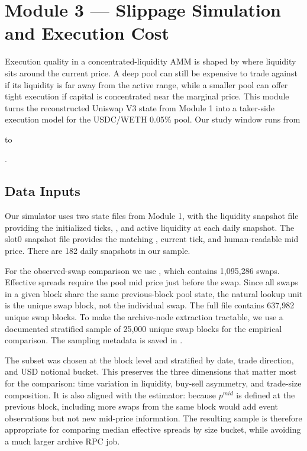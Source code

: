\section{Module 3 --- Slippage Simulation and Execution Cost}
\label{sec:module3}

Execution quality in a concentrated-liquidity AMM is shaped by where liquidity
sits around the current price.  A deep pool can still be expensive to trade
against if its liquidity is far away from the active range, while a smaller pool can
offer tight execution if capital is concentrated near the marginal price.  This
module turns the reconstructed Uniswap V3 state from Module 1 into a taker-side
execution model for the USDC/WETH 0.05\% pool. Our study window runs from
\date{1st October 2025} to \date{31st March 2026}.

\subsection{Data Inputs}
\label{subsec:m3-data}

Our simulator uses two state files from Module 1, with the liquidity snapshot file
providing the initialized ticks, , and active liquidity at
each daily snapshot.  The slot0 snapshot file provides the matching
, current tick, and human-readable mid price. There are 182
daily snapshots in our sample.

For the observed-swap comparison we use , which
contains 1,095,286 swaps.  Effective spreads require the pool mid price just
before the swap.  Since all swaps in a given block share the same
previous-block pool state, the natural lookup unit is the unique swap block, not
the individual swap.  The full file contains 637,982 unique swap blocks.  To
make the archive-node extraction tractable, we use a documented stratified
sample of 25,000 unique swap blocks for the empirical comparison.  The sampling
metadata is saved in .

The subset was chosen at the block level and stratified by date, trade
direction, and USD notional bucket. This preserves the three dimensions that
matter most for the comparison: time variation in liquidity, buy-sell
asymmetry, and trade-size composition.  It is also aligned with the estimator:
because $p^{mid}$ is defined at the previous block, including more swaps from
the same block would add event observations but not new mid-price information.
The resulting sample is therefore appropriate for comparing median effective
spreads by size bucket, while avoiding a much larger archive RPC job.

